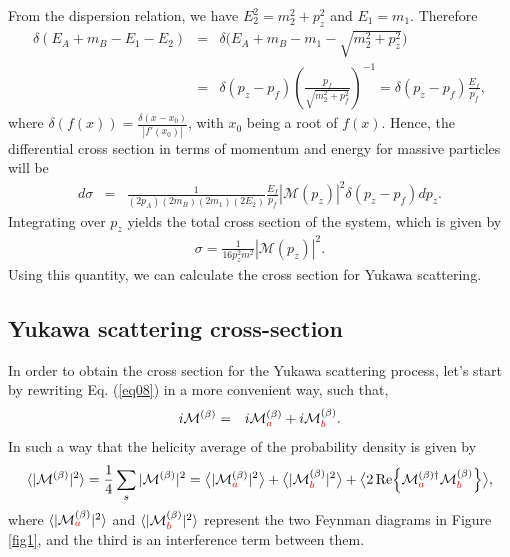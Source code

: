 \documentclass[11pt,showpacs,preprintnumbers,amsmath,amssymb,prd,nofootinbib,superscriptaddress]{revtex4-2}
\begin{document}
From the dispersion relation, we have $E_2^2 = m_2^2 + p_z^2$ and $E_1 = m_1$. Therefore
\begin{eqnarray}
   \delta(E_A+m_B-E_1-E_2)&=&\delta\biggl(E_A+m_B-m_1-\sqrt{m_2^2+p_z^2}\biggr)\nonumber\\
   &=&\delta(p_z-p_f)\left({\frac{p_f}{\sqrt{m_2^2+p_f^2}}}\right)^{-1}=\delta(p_z-p_f)\frac{E_f}{p_f},
\end{eqnarray}
where $\delta(f(x)) = \frac{\delta(x - x_0)}{|f'(x_0)|}$, with $x_0$ being a root of $f(x)$. Hence, the differential cross section in terms of momentum and energy for massive particles will be
\begin{eqnarray}
    d\sigma&=&\frac{1}{(2p_A)(2m_B)(2m_1)(2E_2)}\frac{E_f}{p_f}|\mathcal{M}(p_z)|^2\delta(p_z-p_f)dp_z.
\end{eqnarray}
Integrating over $p_z$ yields the total cross section of the system, which is given by
\begin{eqnarray}
    \sigma=\frac{1}{16p_z^2m^2}|\mathcal{M}(p_z)|^2\label{sigma}.
\end{eqnarray}
Using this quantity, we can calculate the cross section for Yukawa scattering.

\subsection{Yukawa scattering cross-section}\label{seccross}

In order to obtain the cross section for the Yukawa scattering process, let's start by rewriting Eq. (\ref{eq08}) in a more convenient way, such that,\begin{eqnarray}
    i\mathcal{M}^{(\beta)}&=& i\mathcal{M}_{\textcolor{red}{a}}^{(\beta)}+i\mathcal{M}_{\textcolor{red}{b}}^{(\beta)}.
\end{eqnarray}
In such a way that the helicity average of the probability density is given by
\begin{eqnarray}
    \langle|\mathcal{M}^{(\beta)}|^2\rangle =\frac{1}{4}\sum_{s}|\mathcal{M}^{(\beta)}|^2=\bigl\langle|\mathcal{M}^{(\beta)}_{\textcolor{red}{a}}|^2\bigr\rangle +\bigl\langle|\mathcal{M}^{(\beta)}_{\textcolor{red}{b}}|^2\bigr\rangle +\bigl\langle2\Re{\mathcal{M}_{\textcolor{red}{a}}^{(\beta)\dagger}\mathcal{M}_{\textcolor{red}{b}}^{(\beta)}}\bigr\rangle,\label{Mvalue}
\end{eqnarray}
where $\langle|\mathcal{M}_{\textcolor{red}{a}}^{(\beta)}|^2\rangle$ and $\langle|\mathcal{M}_{\textcolor{red}{b}}^{(\beta)}|^2\rangle$ represent the two Feynman diagrams in Figure \ref{fig1}, and the third is an interference term between them.
\end{document}
